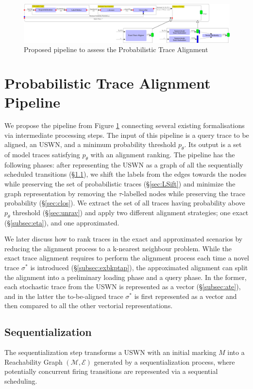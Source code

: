 \begin{figure}[!t]
	\hspace*{-4cm}\includegraphics[width=1.7\textwidth]{images/pipeline}
	\caption{Proposed pipeline to assess the Probabilistic Trace Alignment}\label{fig:pipe}
\end{figure}


\section{Probabilistic Trace Alignment Pipeline}
We propose the pipeline from Figure \ref{fig:pipe} connecting several existing formalisations via intermediate processing steps. 
The input of this pipeline is a query trace to be aligned, an USWN, and a minimum probability threshold $p_\theta$. Its output 
is a set of model traces satisfying $p_\theta$ with an alignment ranking.
%
The pipeline has the following phases: after representing the USWN as a graph of all the sequentially scheduled transitions 
(\S\ref{sec:seqZ}), we shift the labels from the edges towards the nodes while preserving the set of probabilistic traces 
(\S\ref{sec:LSift}) and minimize the graph representation by removing the $\tau$-labelled nodes while preserving the 
trace probability (\S\ref{sec:clos}). We extract the set of all traces having probability above $p_\theta$ threshold (\S\ref{sec:unrav}) and  apply two different alignment strategies; one exact  (\S\ref{subsec:eta}), and one approximated. 


We later discuss how to rank traces in the exact and approximated scenarios by reducing the alignment process to a k-nearest 
neighbour problem. While the exact trace alignment requires to perform the alignment process each time a novel trace $\sigma^*$ is 
introduced (\S\ref{subsec:exbkptap}), the approximated alignment can split the alignment into a preliminary loading phase and a 
query phase. In the former, each stochastic trace from the USWN is represented as a vector (\S\ref{subsec:ate}), and in the latter the to-be-aligned trace $\sigma^*$ is first represented as a vector and then compared to all the other vectorial representations.  

\subsection{Sequentialization}\label{sec:seqZ}
The sequentialization step transforms a USWN with an initial marking $M$ into a Reachability Graph $(\mathcal{M},\mathcal{E})$ 
generated by a sequentialization process, where potentially concurrent firing transitions are represented via a sequential scheduling. 

